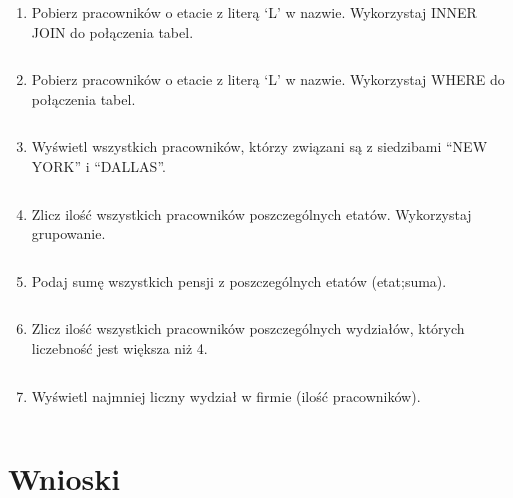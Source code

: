 \documentclass[a4paper, 10pt]{article}
\begin{document}
\begin{enumerate}
\item Pobierz pracowników o etacie z literą `L' w nazwie. Wykorzystaj INNER JOIN do połączenia tabel. 
\begin{lstlisting}[style=SQL]
\end{lstlisting}


\item Pobierz pracowników o etacie z literą `L' w nazwie. Wykorzystaj WHERE do połączenia tabel. 
\begin{lstlisting}[style=SQL]
\end{lstlisting}


\item Wyświetl wszystkich pracowników, którzy związani są z siedzibami ``NEW YORK'' i ``DALLAS''. 
\begin{lstlisting}[style=SQL]
\end{lstlisting}


\item Zlicz ilość wszystkich pracowników poszczególnych etatów. Wykorzystaj grupowanie. 
\begin{lstlisting}[style=SQL]
\end{lstlisting}


\item Podaj sumę wszystkich pensji z poszczególnych etatów (etat;suma).
\begin{lstlisting}[style=SQL]
\end{lstlisting}


\item Zlicz ilość wszystkich pracowników poszczególnych wydziałów, których liczebność jest większa niż 4.  
\begin{lstlisting}[style=SQL]
\end{lstlisting}


\item Wyświetl najmniej liczny wydział w firmie (ilość pracowników).
\begin{lstlisting}[style=SQL]
\end{lstlisting}
\end{enumerate}


\section{Wnioski}
\end{document}
